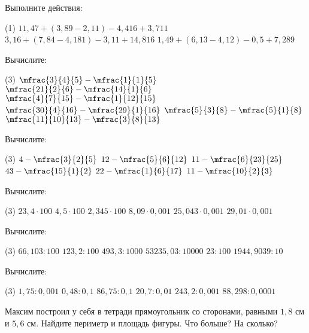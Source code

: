 \begin{class}[number=6]
	\begin{listofex}
		\item Выполните действия:
		\begin{tasks}(1)
			\task \( 11,47+(3,89-2,11)-4,416+3,711 \)
			\task \( 3,16+(7,84-4,181)-3,11+14,816 \)
			\task \( 1,49+(6,13-4,12)-0,5+7,289 \)
		\end{tasks}
		\item Вычислите:
		\begin{tasks}(3)
			\task \( \mfrac{3}{4}{5}-\mfrac{1}{1}{5} \)
			\task \( \mfrac{21}{2}{6}-\mfrac{14}{1}{6} \)
			\task \( \mfrac{4}{7}{15}-\mfrac{1}{12}{15} \)
			\task \( \mfrac{30}{4}{16}-\mfrac{29}{1}{16} \)
			\task \( \mfrac{5}{3}{8}-\mfrac{5}{1}{8} \)
			\task \( \mfrac{11}{10}{13}-\mfrac{3}{8}{13} \)
		\end{tasks}
		\item Вычислите:
		\begin{tasks}(3)
			\task \( 4-\mfrac{3}{2}{5} \)
			\task \( 12-\mfrac{5}{6}{12} \)
			\task \( 11-\mfrac{6}{23}{25} \)
			\task \( 43-\mfrac{15}{1}{2} \)
			\task \( 22-\mfrac{1}{6}{17} \)
			\task \( 11-\mfrac{10}{2}{3} \)
		\end{tasks}
		\item Вычислите:
		\begin{tasks}(3)
			\task \( 23,4\cdot100 \)
			\task\( 4,5 \cdot100 \)
			\task \( 2,345\cdot100 \)
			\task\( 8,09\cdot0,001 \) 
			\task\( 25,043 \cdot0,001  \)
			\task\( 29,01\cdot0,001   \)
		\end{tasks}
		\item Вычислите:
		\begin{tasks}(3)
			\task \( 66,103:100 \)
			\task \( 123,2:100 \)
			\task \( 493,3:1000 \)
			\task \( 53235,03:10000 \)
			\task \( 23:100 \)
			\task \( 1944,9039:10 \)
		\end{tasks}
		\item Вычислите:
		\begin{tasks}(3)
			\task \( 1,75:0,001 \)
			\task \( 0,48:0,1 \)
			\task \( 86,75:0,1\)
			\task \( 20,7:0,01 \)
			\task \( 243,2:0,001 \)
			\task \( 88,298:0,0001 \)
		\end{tasks}
		\item Максим построил у себя в тетради прямоугольник со сторонами, равными \( 1,8 \) см и \( 5,6 \) см. Найдите периметр и площадь фигуры. Что больше? На сколько?
		
	\end{listofex}
\end{class}

